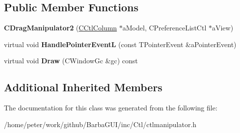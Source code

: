 \subsection*{Public Member Functions}
\begin{DoxyCompactItemize}
\item 
\mbox{\label{classCDragManipulator2_a7de95d6531395a969562c3ae81b050b4}} 
{\bfseries C\+Drag\+Manipulator2} (\hyperlink{classCCtlColumn}{C\+Ctl\+Column} $\ast$a\+Model, C\+Preference\+List\+Ctl $\ast$a\+View)
\item 
\mbox{\label{classCDragManipulator2_a13effd7ec990464d7b1d4eff7b2ce3de}} 
virtual void {\bfseries Handle\+Pointer\+EventL} (const T\+Pointer\+Event \&a\+Pointer\+Event)
\item 
\mbox{\label{classCDragManipulator2_a4b12e62a7bb018bb2411a6fc51ca2d6f}} 
virtual void {\bfseries Draw} (C\+Window\+Gc \&gc) const
\end{DoxyCompactItemize}
\subsection*{Additional Inherited Members}


The documentation for this class was generated from the following file\+:\begin{DoxyCompactItemize}
\item 
/home/peter/work/github/\+Barba\+G\+U\+I/inc/\+Ctl/ctlmanipulator.\+h\end{DoxyCompactItemize}
